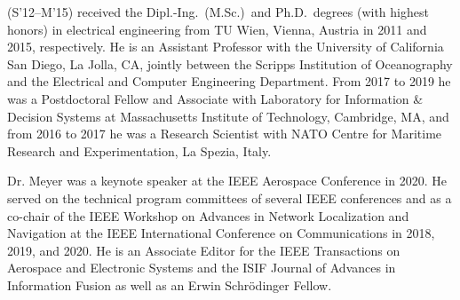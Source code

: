 (S'12--M'15) received the Dipl.-Ing.\ (M.Sc.)\ and Ph.D.\ degrees (with highest honors) in electrical engineering from TU Wien, Vienna, Austria in 2011 and 2015, respectively. 
He is an Assistant Professor with the University of California San Diego, La Jolla, CA, jointly between the Scripps Institution of Oceanography and the Electrical and Computer Engineering Department. From 2017 to 2019 he was a Postdoctoral Fellow and Associate with Laboratory for Information \& Decision Systems at Massachusetts Institute of Technology, Cambridge, MA, and from 2016 to 2017 he was a Research Scientist with NATO Centre for Maritime Research and Experimentation, La Spezia, Italy. 

Dr. Meyer was a keynote speaker at the IEEE Aerospace Conference in 2020. He served on the technical program committees of several IEEE conferences and as a co-chair of the IEEE Workshop on Advances in Network Localization and Navigation at the IEEE International Conference on Communications in 2018, 2019, and 2020. He is an Associate Editor for the IEEE Transactions on Aerospace and Electronic Systems and the ISIF Journal of Advances in Information Fusion as well as an Erwin Schr{\"o}dinger Fellow.